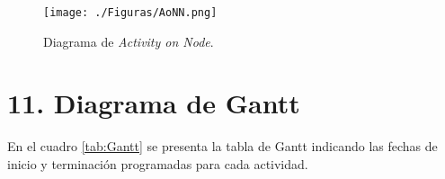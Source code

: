 \documentclass[
11pt, %
codirector, %
]{charter}
\begin{document}


\begin{figure}[htpb]
\centering 
\texttt{[image: ./Figuras/AoNN.png]}
\caption{Diagrama de \textit{Activity on Node}.}
\label{fig:AoNN}
\end{figure}



\section{11. Diagrama de Gantt}
\label{sec:gantt}


En el cuadro \ref{tab:Gantt} se presenta la tabla de Gantt indicando las fechas de inicio y terminación programadas para cada actividad.
\end{document}
